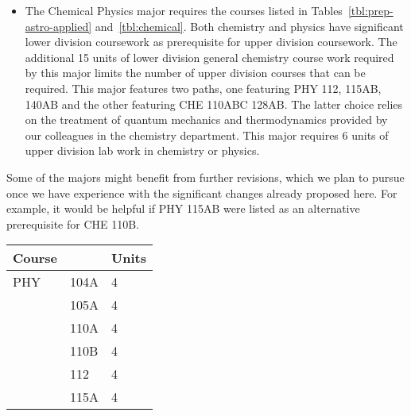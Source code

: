 \documentclass[12pt]{article}
\begin{document}
\begin{itemize}
\item The Chemical Physics major requires the courses listed in
  Tables~\ref{tbl:prep-astro-applied} and~\ref{tbl:chemical}.  
  Both chemistry and physics have significant lower division
  coursework as prerequisite for upper division coursework.  The
  additional 15 units of lower division general chemistry course
  work required by this major limits the number of upper division
  courses that can be required.  This major features two paths, one
  featuring PHY 112, 115AB, 140AB and the other featuring CHE 110ABC
  128AB.  The latter choice relies on the treatment of quantum
  mechanics and thermodynamics provided by our colleagues in the
  chemistry department.  This major requires 6 units of upper division
  lab work in chemistry or physics.
\end{itemize}
Some of the majors might benefit from further revisions, which we plan
to pursue once we have experience with the significant changes already
proposed here.  For example, it would be helpful if PHY 115AB were
listed as an alternative prerequisite for CHE 110B.

\noindent
\vskip 0.25cm
\begin{center}
\begin{tabular}{|lll|}
\hline
Course & & Units \\
\hline
PHY & 104A   & 4 \\  
    & 105A   & 4 \\ 
    & 110A   & 4 \\ 
    & 110B   & 4 \\
    & 112    & 4 \\
    & 115A   & 4 \\ 
\hline
\end{tabular}
\end{center}
\end{document}
